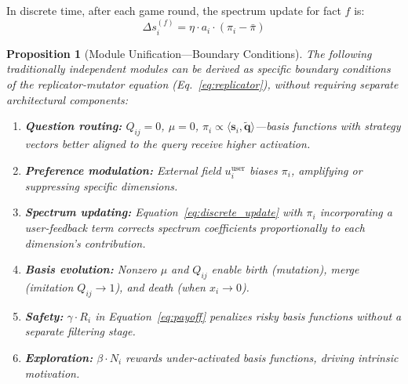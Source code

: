 \documentclass[review]{elsarticle}
\newtheorem{proposition}{Proposition}
\begin{document}
In discrete time, after each game round, the spectrum update for fact $f$ is:
\begin{equation}
\Delta s_i^{(f)} = \eta \cdot a_i \cdot (\pi_i - \bar{\pi})
\label{eq:discrete_update}
\end{equation}

\begin{proposition}[Module Unification---Boundary Conditions]
\label{prop:unification}
The following traditionally independent modules can be derived as specific
boundary conditions of the replicator-mutator equation (Eq.~\ref{eq:replicator}),
without requiring separate architectural components:
\begin{enumerate}[leftmargin=*,itemsep=0pt]
\item \textbf{Question routing:} $Q_{ij} = 0$, $\mu = 0$, $\pi_i \propto
  \langle\mathbf{s}_i, \tilde{\mathbf{q}}\rangle$---basis functions with
  strategy vectors better aligned to the query receive higher activation.
\item \textbf{Preference modulation:} External field $u^{\text{user}}_i$
  biases $\pi_i$, amplifying or suppressing specific dimensions.
\item \textbf{Spectrum updating:} Equation~\ref{eq:discrete_update} with
  $\pi_i$ incorporating a user-feedback term corrects spectrum coefficients
  proportionally to each dimension's contribution.
\item \textbf{Basis evolution:} Nonzero $\mu$ and $Q_{ij}$ enable birth
  (mutation), merge (imitation $Q_{ij} \to 1$), and death (when
  $x_i \to 0$).
\item \textbf{Safety:} $\gamma \cdot R_i$ in Equation~\ref{eq:payoff}
  penalizes risky basis functions without a separate filtering stage.
\item \textbf{Exploration:} $\beta \cdot N_i$ rewards under-activated
  basis functions, driving intrinsic motivation.
\end{enumerate}
\end{proposition}
\end{document}
